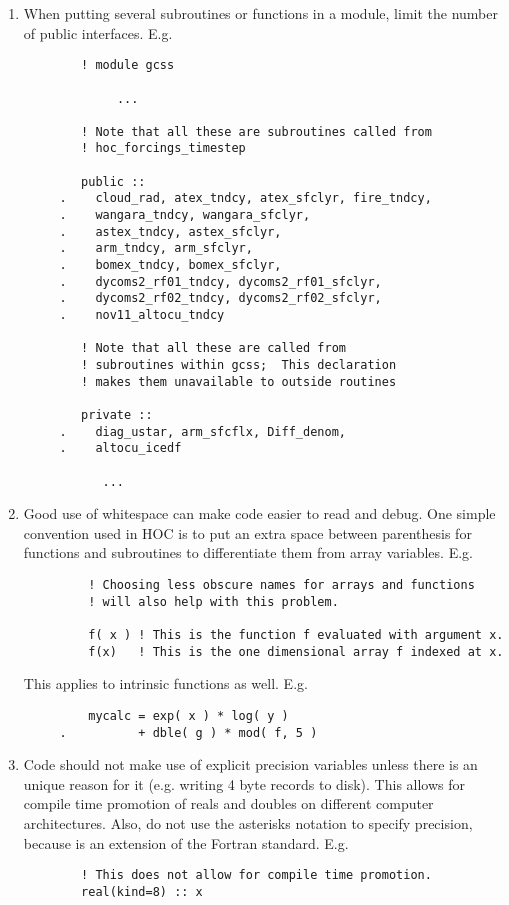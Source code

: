 \documentclass[letterpaper,12pt]{article}
\begin{document}
\begin{enumerate}
\item When putting several subroutines or functions in a module, limit the
 number of public interfaces. 
E.g. 
\begin{verbatim}
        ! module gcss

             ...

        ! Note that all these are subroutines called from 
        ! hoc_forcings_timestep

        public ::
     .    cloud_rad, atex_tndcy, atex_sfclyr, fire_tndcy,
     .    wangara_tndcy, wangara_sfclyr,
     .    astex_tndcy, astex_sfclyr,
     .    arm_tndcy, arm_sfclyr,
     .    bomex_tndcy, bomex_sfclyr,
     .    dycoms2_rf01_tndcy, dycoms2_rf01_sfclyr,
     .    dycoms2_rf02_tndcy, dycoms2_rf02_sfclyr,
     .    nov11_altocu_tndcy 

        ! Note that all these are called from 
        ! subroutines within gcss;  This declaration
        ! makes them unavailable to outside routines

        private ::
     .    diag_ustar, arm_sfcflx, Diff_denom,
     .    altocu_icedf

           ...

\end{verbatim}

\item Good use of whitespace can make code easier to read and debug.  
One simple convention used in HOC is to put an extra space between 
parenthesis for functions and subroutines to differentiate them from 
array variables. \newline
E.g.
\begin{verbatim}
         ! Choosing less obscure names for arrays and functions 
         ! will also help with this problem.

         f( x ) ! This is the function f evaluated with argument x.
         f(x)   ! This is the one dimensional array f indexed at x.
\end{verbatim}

This applies to intrinsic functions as well. \newline
E.g.
\begin{verbatim}
         mycalc = exp( x ) * log( y ) 
     .          + dble( g ) * mod( f, 5 )
\end{verbatim}

\item Code should not make use of explicit precision variables unless there is 
an unique reason for it (e.g. writing 4 byte records to disk).  This allows for 
compile time promotion of reals and doubles on different computer architectures.
Also, do not use the asterisks notation to specify precision, because
is an extension of the Fortran standard.  E.g.
\begin{verbatim}
        ! This does not allow for compile time promotion.
        real(kind=8) :: x


\end{verbatim}
\end{enumerate}
\end{document}
